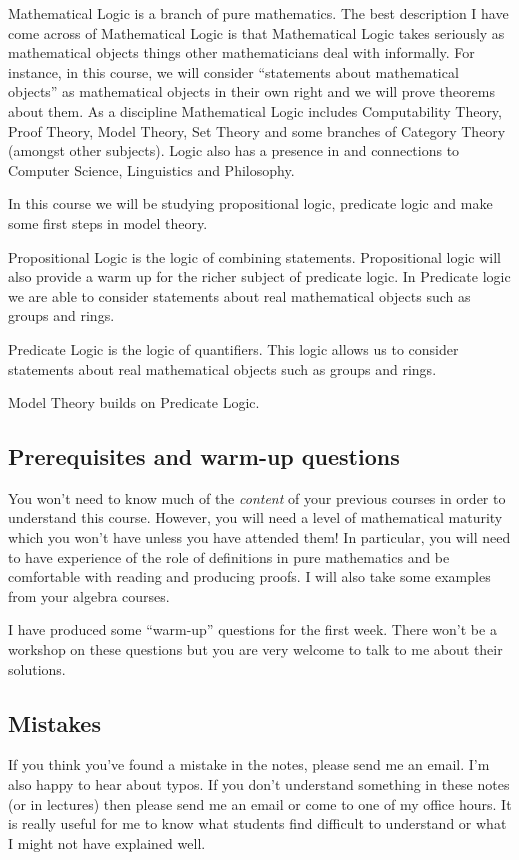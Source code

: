 \documentclass[11pt]{article}
\begin{document}
Mathematical Logic is a branch of pure mathematics. The best description I have come across of Mathematical Logic is that Mathematical Logic takes seriously as mathematical objects things other mathematicians deal with informally. For instance, in this course, we will consider ``statements about mathematical objects'' as mathematical objects in their own right and we will prove theorems about them. As a discipline Mathematical Logic includes Computability Theory, Proof Theory, Model Theory, Set Theory and some branches of Category Theory (amongst other subjects). Logic also has a presence in and connections to Computer Science, Linguistics and Philosophy.

In this course we will be studying propositional logic, predicate logic and make some first steps in model theory.

Propositional Logic is the logic of combining statements. Propositional logic will also provide a warm up for the richer subject of predicate logic. In Predicate logic we are able to consider statements about real mathematical objects such as groups and rings.

Predicate Logic is the logic of quantifiers. This logic allows us to consider statements about real mathematical objects such as groups and rings.

Model Theory builds on Predicate Logic.

\subsection*{Prerequisites and warm-up questions}

You won't need to know much of the \textit{content} of your previous courses in order to understand this course. However, you will need a level of mathematical maturity which you won't have unless you have attended them! In particular, you will need to have experience of the role of definitions in pure mathematics and be comfortable with reading and producing proofs. I will also take some examples from your algebra courses.

I have produced some ``warm-up'' questions for the first week. There won't be a workshop on these questions but you are very welcome to talk to me about their solutions.

\subsection*{Mistakes}
If you think you've found a mistake in the notes, please send me an email. I'm also happy to hear about typos. If you don't understand something in these notes (or in lectures) then please send me an email or come to one of my office hours. It is really useful for me to know what students find difficult to understand or what I might not have explained well.
\end{document}
